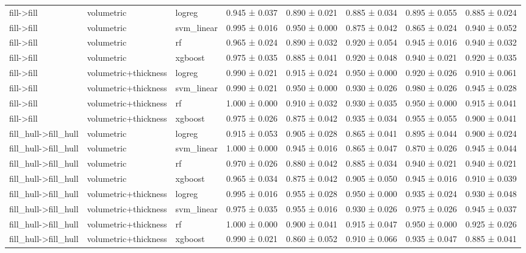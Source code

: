 \begin{tabular}{llllllll}
fill->fill & volumetric & logreg & 0.945 ± 0.037 & 0.890 ± 0.021 & 0.885 ± 0.034 & 0.895 ± 0.055 & 0.885 ± 0.024 \\
fill->fill & volumetric & svm\_linear & 0.995 ± 0.016 & 0.950 ± 0.000 & 0.875 ± 0.042 & 0.865 ± 0.024 & 0.940 ± 0.052 \\
fill->fill & volumetric & rf & 0.965 ± 0.024 & 0.890 ± 0.032 & 0.920 ± 0.054 & 0.945 ± 0.016 & 0.940 ± 0.032 \\
fill->fill & volumetric & xgboost & 0.975 ± 0.035 & 0.885 ± 0.041 & 0.920 ± 0.048 & 0.940 ± 0.021 & 0.920 ± 0.035 \\
fill->fill & volumetric+thickness & logreg & 0.990 ± 0.021 & 0.915 ± 0.024 & 0.950 ± 0.000 & 0.920 ± 0.026 & 0.910 ± 0.061 \\
fill->fill & volumetric+thickness & svm\_linear & 0.990 ± 0.021 & 0.950 ± 0.000 & 0.930 ± 0.026 & 0.980 ± 0.026 & 0.945 ± 0.028 \\
fill->fill & volumetric+thickness & rf & 1.000 ± 0.000 & 0.910 ± 0.032 & 0.930 ± 0.035 & 0.950 ± 0.000 & 0.915 ± 0.041 \\
fill->fill & volumetric+thickness & xgboost & 0.975 ± 0.026 & 0.875 ± 0.042 & 0.935 ± 0.034 & 0.955 ± 0.055 & 0.900 ± 0.041 \\
fill\_hull->fill\_hull & volumetric & logreg & 0.915 ± 0.053 & 0.905 ± 0.028 & 0.865 ± 0.041 & 0.895 ± 0.044 & 0.900 ± 0.024 \\
fill\_hull->fill\_hull & volumetric & svm\_linear & 1.000 ± 0.000 & 0.945 ± 0.016 & 0.865 ± 0.047 & 0.870 ± 0.026 & 0.945 ± 0.044 \\
fill\_hull->fill\_hull & volumetric & rf & 0.970 ± 0.026 & 0.880 ± 0.042 & 0.885 ± 0.034 & 0.940 ± 0.021 & 0.940 ± 0.021 \\
fill\_hull->fill\_hull & volumetric & xgboost & 0.965 ± 0.034 & 0.875 ± 0.042 & 0.905 ± 0.050 & 0.945 ± 0.016 & 0.910 ± 0.039 \\
fill\_hull->fill\_hull & volumetric+thickness & logreg & 0.995 ± 0.016 & 0.955 ± 0.028 & 0.950 ± 0.000 & 0.935 ± 0.024 & 0.930 ± 0.048 \\
fill\_hull->fill\_hull & volumetric+thickness & svm\_linear & 0.975 ± 0.035 & 0.955 ± 0.016 & 0.930 ± 0.026 & 0.975 ± 0.026 & 0.945 ± 0.037 \\
fill\_hull->fill\_hull & volumetric+thickness & rf & 1.000 ± 0.000 & 0.900 ± 0.041 & 0.915 ± 0.047 & 0.950 ± 0.000 & 0.925 ± 0.026 \\
fill\_hull->fill\_hull & volumetric+thickness & xgboost & 0.990 ± 0.021 & 0.860 ± 0.052 & 0.910 ± 0.066 & 0.935 ± 0.047 & 0.885 ± 0.041 \\
\bottomrule
\end{tabular}
